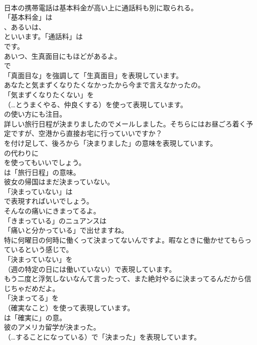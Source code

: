 \documentclass[8pt]{extreport}
\begin{document}
\begin{CJK}{UTF8}{min}
\\	日本の携帯電話は基本料金が高い上に通話料も別に取られる。 
\\	「基本料金」は 
\\	、あるいは、
\\	といいます。「通話料」は
\\	です。	
\\	あいつ、生真面目にもほどがあるよ。 
\\	で
\\	「真面目な」を強調して「生真面目」を表現しています。	
\\	あなたと気まずくなりたくなかったから今まで言えなかったの。 
\\	「気まずくなりたくない」を 
\\	（…とうまくやる、仲良くする）を使って表現しています。
\\	の使い方にも注目。	
\\	詳しい旅行日程が決まりましたのでメールしました。そちらにはお昼ごろ着く予定ですが、空港から直接お宅に行っていいですか？ 
\\	を付け足して、後ろから「決まりました」の意味を表現しています。
\\	の代わりに 
\\	を使ってもいいでしょう。
\\	は「旅行日程」の意味。	
\\	彼女の帰国はまだ決まっていない。 
\\	「決まっていない」は 
\\	で表現すればいいでしょう。	
\\	そんなの痛いにきまってるよ。 
\\	「きまっている」のニュアンスは
\\	「痛いと分かっている」で出せますね。	
\\	特に何曜日の何時に働くって決まってないんですよ。暇なときに働かせてもらっているという感じで。 
\\	「決まっていない」を 
\\	（週の特定の日には働いていない）で表現しています。	
\\	もう二度と浮気しないなんて言ったって、また絶対やるに決まってるんだから信じちゃだめだよ。 
\\	「決まってる」を 
\\	（確実なこと）を使って表現しています。
\\	は「確実に」の意。	
\\	彼のアメリカ留学が決まった。 
\\	（…することになっている）で「決まった」を表現しています。	

\end{CJK}
\end{document}
